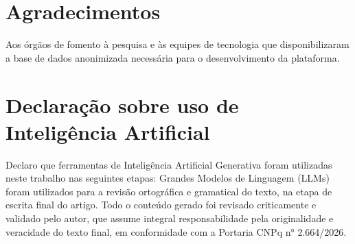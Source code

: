 \documentclass[10pt,conference]{IEEEtran}
\begin{document}

\section*{Agradecimentos}
Aos órgãos de fomento à pesquisa e às equipes de tecnologia que disponibilizaram a base de dados anonimizada necessária para o desenvolvimento da plataforma.

\section*{Declaração sobre uso de Inteligência Artificial}
Declaro que ferramentas de Inteligência Artificial Generativa foram utilizadas neste trabalho nas seguintes etapas: Grandes Modelos de Linguagem (LLMs) foram utilizados para a revisão ortográfica e gramatical do texto, na etapa de escrita final do artigo. Todo o conteúdo gerado foi revisado criticamente e validado pelo autor, que assume integral responsabilidade pela originalidade e veracidade do texto final, em conformidade com a Portaria CNPq n° 2.664/2026.



\end{document}
